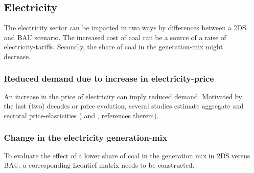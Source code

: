 \documentclass[12pt,english]{article}
\begin{document}
\subsection{Electricity}

The electricity sector can be impacted in two ways by differences between a 2DS and BAU scenario. The increased cost of coal can be a source of a raise of electricity-tariffs. Secondly, the share of coal in the generation-mix might decrease.

\subsubsection{Reduced demand due to increase in electricity-price}

An increase in the price of electricity can imply reduced demand. Motivated by the last (two) decades or price evolution, several studies estimate aggregate and sectoral price-elasticities (\cite{inglesi2010forecasting} and \cite{goliger2018electricity}, references therein). 


\subsubsection{Change in the electricity generation-mix}


To evaluate the effect of a lower share of coal in the generation mix in 2DS versus BAU, a corresponding Leontief matrix needs to be constructed. 
\end{document}
